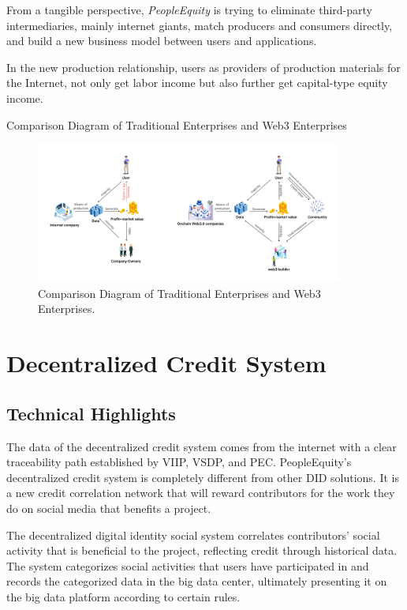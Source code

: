 \documentclass{article}
\begin{document}
From a tangible perspective, \emph{PeopleEquity} is trying to eliminate third-party intermediaries, mainly internet giants, match producers and consumers directly, and build a new business model between users and applications.

In the new production relationship, users as providers of production materials for the Internet, not only get labor income but also further get capital-type equity income.

Comparison Diagram of Traditional Enterprises and Web3 Enterprises
\begin{figure}
\centering
\includegraphics[width=0.9\textwidth]{./img/comparion_web2_web3_company.png}
\caption{\label{fig}Comparison Diagram of Traditional Enterprises and Web3 Enterprises.}
\end{figure}

\section{Decentralized Credit System}
\subsection{Technical Highlights}
The data of the decentralized credit system comes from the internet with a clear traceability path established by VIIP, VSDP, and PEC. PeopleEquity's decentralized credit system is completely different from other DID solutions. It is a new credit correlation network that will reward contributors for the work they do on social media that benefits a project. 

The decentralized digital identity social system correlates contributors’ social activity that is beneficial to the project, reflecting credit through historical data. The system categorizes social activities that users have participated in and records the categorized data in the big data center, ultimately presenting it on the big data platform according to certain rules.
\end{document}

